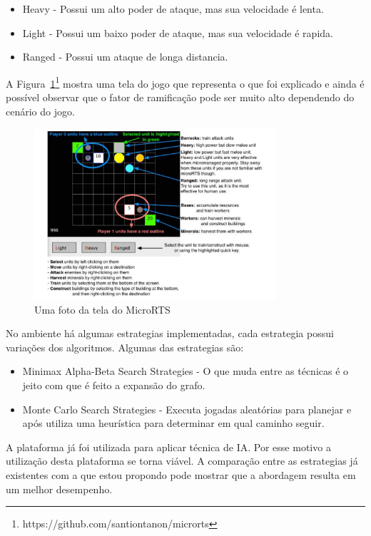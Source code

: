 \begin{itemize}
	\item Heavy - Possui um alto poder de ataque, mas sua velocidade é lenta.
	\item Light - Possui um baixo poder de ataque, mas sua velocidade é rapida.
	\item Ranged - Possui um ataque de longa distancia. 
\end{itemize} 

A Figura~\ref{fig:microrts}\footnote{https://github.com/santiontanon/microrts} mostra uma tela do jogo que representa o que foi explicado e ainda é possível observar que o fator de ramificação pode ser muito alto dependendo do cenário do jogo. %

\begin{figure}[ht]
	\centering
	\includegraphics[width=0.8\textwidth]{fig/microrts.pdf}
	\caption{Uma foto da tela do MicroRTS}
	\label{fig:microrts}
\end{figure} 

No ambiente há algumas estrategias implementadas, cada estrategia possui variações dos algoritmos. Algumas das estrategias são:
\begin{itemize}
	\item Minimax Alpha-Beta Search Strategies - O que muda entre as técnicas é o jeito com que é feito a expansão do grafo.
	\item Monte Carlo Search Strategies - Executa jogadas aleatórias para planejar e após utiliza uma heurística para determinar em qual caminho seguir.
\end{itemize}

A plataforma já foi utilizada para aplicar técnica de IA. Por esse motivo a utilização desta plataforma se torna viável. A comparação entre as estrategias já existentes com a que estou propondo pode mostrar que a abordagem resulta em um melhor desempenho. 
